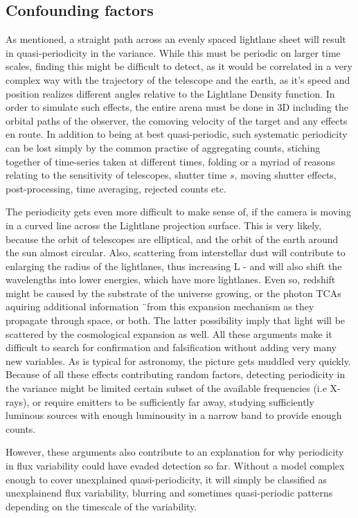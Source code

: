 \documentclass[notitlepage]{article}
\begin{document}
\subsection{Confounding factors}
As mentioned, a straight path across an evenly spaced lightlane sheet will result in quasi-periodicity in the variance. While this must be periodic on larger time scales, finding this might be difficult to detect, as it would be correlated in a very complex way with the trajectory of the telescope and the earth, as it's speed and position realizes different angles relative to the Lightlane Density function. In order to simulate such effects, the entire arena must be done in 3D including the orbital paths of the observer,  the comoving velocity of the target and any effects en route. In addition to being at best quasi-periodic, such systematic periodicity can be lost simply by the common practise of aggregating counts, stiching together of time-series taken at different times, folding or a myriad of reasons relating to the sensitivity of telescopes, shutter time $s$, moving shutter effects, post-processing, time averaging, rejected counts etc. 

The periodicity gets even more difficult to make sense of, if the camera is moving in a curved line across the Lightlane projection surface. This is very likely, because the orbit of telescopes are elliptical, and the orbit of the earth around the sun almost circular. 
Also, scattering from interstellar dust will contribute to enlarging the radius of the lightlanes, thus increasing L - and will also shift the wavelengths into lower energies, which have more lightlanes. Even so, redshift might be caused by the substrate of the universe growing, or the photon TCAs aquiring additional information ¨from this expansion mechanism as they propagate through space, or both. The latter possibility imply that light will be scattered by the cosmological expansion as well. All these arguments make it difficult to search for confirmation and falsification without adding very many new variables. As is typical for astronomy, the picture gets muddled very quickly. 
Because of all these effects contributing random factors, detecting periodicity in the variance might be limited certain subset of the available frequencies (i.e X-rays), or require emitters to be sufficiently far away, studying sufficiently luminous sources with enough luminousity in a narrow band to provide enough counts. 

However, these arguments also contribute to an explanation for why  periodicity in flux variability could have evaded detection so far. Without a model complex enough to cover unexplained quasi-periodicity, it will simply be classified as unexplainend flux variability,  blurring and sometimes quasi-periodic patterns depending on the timescale of the variability.  
\end{document}
